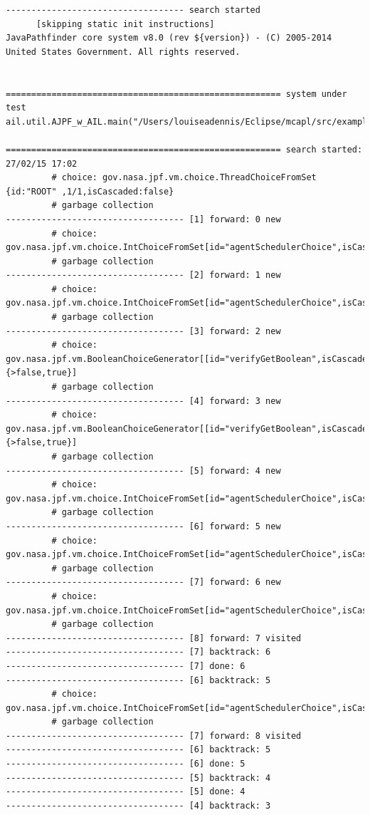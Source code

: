 \documentclass[a4]{article}
\begin{document}
\begin{small}
\begin{verbatim}
----------------------------------- search started
      [skipping static init instructions]
JavaPathfinder core system v8.0 (rev ${version}) - (C) 2005-2014 United States Government. All rights reserved.


====================================================== system under test
ail.util.AJPF_w_AIL.main("/Users/louiseadennis/Eclipse/mcapl/src/examples/gwendolen/ajpf_tutorials/tutorial2/TwoPickUpAgents.ail","/Users/louiseadennis/Eclipse/mcapl/src/examples/gwendolen/ajpf_tutorials/tutorial2/PickUpAgent.psl","1")

====================================================== search started: 27/02/15 17:02
		 # choice: gov.nasa.jpf.vm.choice.ThreadChoiceFromSet {id:"ROOT" ,1/1,isCascaded:false}
		 # garbage collection
----------------------------------- [1] forward: 0 new
		 # choice: gov.nasa.jpf.vm.choice.IntChoiceFromSet[id="agentSchedulerChoice",isCascaded:false,>0,1]
		 # garbage collection
----------------------------------- [2] forward: 1 new
		 # choice: gov.nasa.jpf.vm.choice.IntChoiceFromSet[id="agentSchedulerChoice",isCascaded:false,>0,1]
		 # garbage collection
----------------------------------- [3] forward: 2 new
		 # choice: gov.nasa.jpf.vm.BooleanChoiceGenerator[[id="verifyGetBoolean",isCascaded:false,{>false,true}]
		 # garbage collection
----------------------------------- [4] forward: 3 new
		 # choice: gov.nasa.jpf.vm.BooleanChoiceGenerator[[id="verifyGetBoolean",isCascaded:false,{>false,true}]
		 # garbage collection
----------------------------------- [5] forward: 4 new
		 # choice: gov.nasa.jpf.vm.choice.IntChoiceFromSet[id="agentSchedulerChoice",isCascaded:false,>0]
		 # garbage collection
----------------------------------- [6] forward: 5 new
		 # choice: gov.nasa.jpf.vm.choice.IntChoiceFromSet[id="agentSchedulerChoice",isCascaded:false,>0,1]
		 # garbage collection
----------------------------------- [7] forward: 6 new
		 # choice: gov.nasa.jpf.vm.choice.IntChoiceFromSet[id="agentSchedulerChoice",isCascaded:false,>0]
		 # garbage collection
----------------------------------- [8] forward: 7 visited
----------------------------------- [7] backtrack: 6
----------------------------------- [7] done: 6
----------------------------------- [6] backtrack: 5
		 # choice: gov.nasa.jpf.vm.choice.IntChoiceFromSet[id="agentSchedulerChoice",isCascaded:false,0,>1]
		 # garbage collection
----------------------------------- [7] forward: 8 visited
----------------------------------- [6] backtrack: 5
----------------------------------- [6] done: 5
----------------------------------- [5] backtrack: 4
----------------------------------- [5] done: 4
----------------------------------- [4] backtrack: 3
\end{verbatim}
\end{small}
\end{document}
